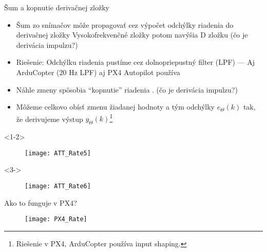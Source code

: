 \begin{frame}[t]{Šum a kopnutie derivačnej zložky}
  \begin{itemize}
    \item<1-2> Šum zo snímačov môže propagovať cez výpočet odchýlky riadenia do derivačnej zložky Vysokofrekvenčné zložky potom navýšia D zložku (čo je derivácia impulzu?)
    \item<2> Riešenie: Odchýlku riadenia pustíme cez dolnopriepustný  filter (LPF) --- Aj ArduCopter (20 Hz LPF) aj PX4 Autopilot používa \citep{AP:PID,PX4:PID}
    \item<3-> Náhle zmeny spôsobia ``kopnutie'' riadenia . (čo je derivácia impulzu?)
    \item<4-> Môžeme celkovo obísť zmenu žiadanej hodnoty a tým odchýlky  $e_\Theta(k)$ tak, že derivujeme výstup $y_\Theta(k)$\footnote{Riešenie v PX4, ArduCopter používa input shaping.}
  \end{itemize}
      \begin{onlyenv}<1-2>
  \begin{figure}
\centering
  \texttt{[image: ATT\_Rate5]}\\
\end{figure}
\end{onlyenv}

\begin{onlyenv}<3->
  \begin{figure}
\centering
  \texttt{[image: ATT\_Rate6]}\\
\end{figure}
\end{onlyenv}


\end{frame}

\begin{frame}{Ako to funguje v PX4?}
  \begin{figure}
\centering
  \texttt{[image: PX4\_Rate]}\\
\end{figure}

\end{frame} 